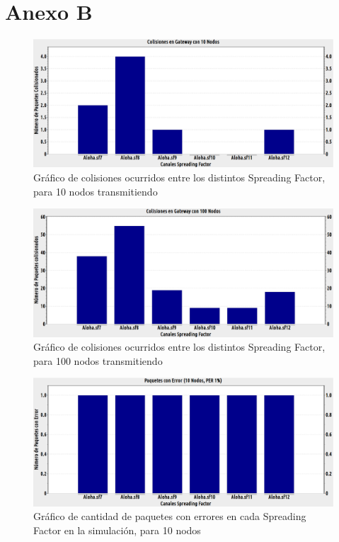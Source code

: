 \chapter{Anexo B}

\begin{figure}[!ht]
\centering
\includegraphics[angle=270, scale=0.4]{images/colisiones10nodos.eps}
\caption{Gráfico de colisiones ocurridos entre los distintos Spreading Factor, para 10 nodos transmitiendo}
\label{anexb:1}
\end{figure}


\begin{figure}[!ht]
\centering
\includegraphics[angle=270, scale=0.4]{images/colisiones100nodos.eps}
\caption{Gráfico de colisiones ocurridos entre los distintos Spreading Factor, para 100 nodos transmitiendo}
\label{anexb:2}
\end{figure}

\begin{figure}[!ht]
\centering
\includegraphics[angle=270, scale=0.4]{images/errores10nodos.eps}
\caption{Gráfico de cantidad de paquetes con errores en cada Spreading Factor en la simulación, para 10 nodos}
\label{anexb:3}
\end{figure}

